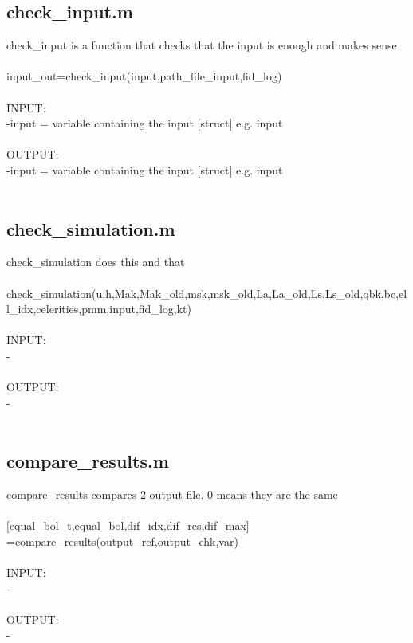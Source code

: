 \subsection{check\_input.m}
check\_input is a function that checks that the input is enough and makes sense \\ 
 \\ 
input\_out=check\_input(input,path\_file\_input,fid\_log) \\ 
 \\ 
INPUT: \\ 
   -input = variable containing the input $[$struct$]$ e.g. input \\ 
 \\ 
OUTPUT: \\ 
   -input = variable containing the input $[$struct$]$ e.g. input \\ 
 \\ 
\subsection{check\_simulation.m}
check\_simulation does this and that \\ 
 \\ 
check\_simulation(u,h,Mak,Mak\_old,msk,msk\_old,La,La\_old,Ls,Ls\_old,qbk,bc,ell\_idx,celerities,pmm,input,fid\_log,kt) \\ 
 \\ 
INPUT: \\ 
   - \\ 
 \\ 
OUTPUT: \\ 
   - \\ 
 \\ 
\subsection{compare\_results.m}
compare\_results compares 2 output file. 0 means they are the same \\ 
 \\ 
$[$equal\_bol\_t,equal\_bol,dif\_idx,dif\_res,dif\_max$]$=compare\_results(output\_ref,output\_chk,var) \\ 
 \\ 
INPUT: \\ 
   - \\ 
 \\ 
OUTPUT: \\ 
   - \\ 
 \\ 
